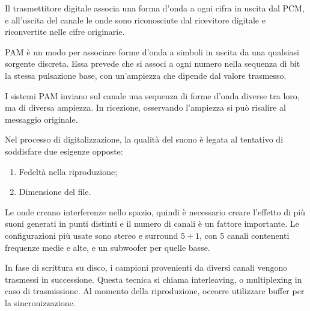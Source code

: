 Il trasmettitore digitale associa una forma d'onda a ogni cifra in uscita dal PCM, e all'uscita del canale le onde sono riconosciute dal ricevitore digitale e riconvertite nelle cifre originarie.

PAM è un modo per associare forme d'onda a simboli in uscita da una qualsiasi sorgente discreta. Essa prevede che si associ a ogni numero nella sequenza di bit la stessa pulsazione base, con un'ampiezza che dipende dal valore trasmesso.

I sistemi PAM inviano sul canale una sequenza di forme d'onda diverse tra loro, ma di diversa ampiezza. In ricezione, osservando l'ampiezza si può risalire al messaggio originale.

Nel processo di digitalizzazione, la qualità del suono è legata al tentativo di soddisfare due esigenze opposte:
\begin{enumerate}
	\item Fedeltà nella riproduzione;
	\item Dimensione del file.
\end{enumerate}

Le onde creano interferenze nello spazio, quindi è necessario creare l'effetto di più suoni generati in punti distinti e il numero di canali è un fattore importante. Le configurazioni più usate sono stereo e surround $5 + 1$, con 5 canali contenenti frequenze medie e alte, e un subwoofer per quelle basse. 

In fase di scrittura su disco, i campioni provenienti da diversi canali vengono trasmessi in successione. Questa tecnica si chiama interleaving, o multiplexing in caso di trasmissione. Al momento della riproduzione, occorre utilizzare buffer per la sincronizzazione.
